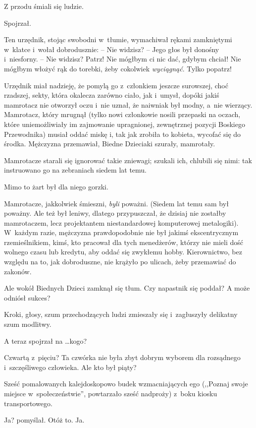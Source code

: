 \documentclass[oneside,polish,11pt,rmheadings]{mwbk}
\begin{document}
Z przodu śmiali się ludzie. 

Spojrzał. 

Ten urzędnik, stojąc swobodni w~tłumie, wymachiwał rękami zamkniętymi w~klatce i~wołał dobrodusznie:  -- Nie widzisz? -- Jego głos był donośny i~niesforny. -- Nie widzisz?  Patrz!  Nie mógłbym ci nic dać, gdybym chciał! Nie mógłbym włożyć rąk do torebki, żeby cokolwiek \textit{wyciągnąć}. Tylko popatrz! 

Urzędnik miał nadzieję, że pomylą go z~członkiem jeszcze surowszej, choć rzadszej, sekty, która okalecza zarówno ciało, jak i~umysł, dopóki jakiś mamrotacz nie otworzył oczu i~nie uznał, że naiwniak był modny, a~nie wierzący. Mamrotacz, który mrugnął (tylko nowi członkowie nosili przepaski na oczach, które uniemożliwiały im zajmowanie upragnionej, zewnętrznej pozycji Boskiego Przewodnika) musiał oddać miskę i, tak jak zrobiła to kobieta, wycofać się do środka. Mężczyzna przemawiał, Biedne Dzieciaki szurały, mamrotały. 

Mamrotacze starali się ignorować takie zniewagi; szukali ich, chlubili się nimi: tak instruowano go na zebraniach siedem lat temu. 

Mimo to żart był dla niego gorzki. 

Mamrotacze, jakkolwiek śmieszni, \textit{byli }poważni. (Siedem lat temu sam był poważny. Ale też był leniwy, dlatego przypuszczał, że dzisiaj nie zostałby mamrotaczem, lecz projektantem niestandardowej komputerowej metalogiki). W~każdym razie, mężczyzna prawdopodobnie nie był jakimś ekscentrycznym rzemieślnikiem, kimś, kto pracował dla tych menedżerów, którzy nie mieli dość wolnego czasu lub kredytu, aby oddać się zwykłemu hobby. Kierownictwo, bez względu na to, jak dobroduszne, nie krążyło po ulicach, żeby przemawiać do zakonów. 

Ale wokół Biednych Dzieci zamknął się tłum. 
Czy napastnik się poddał? A może odniósł sukces? 

Kroki, głosy, szum przechodzących ludzi zmieszały się i~zagłuszyły delikatny szum modlitwy. 

A teraz spojrzał na \ldots  kogo? 

Czwartą z~pięciu? Ta czwórka nie była zbyt dobrym wyborem dla rozsądnego i~szczęśliwego człowieka. Ale kto był piąty? 

Sześć pomalowanych kalejdoskopowo budek wzmacniających ego (,,Poznaj swoje miejsce w~społeczeństwie'', powtarzało sześć nadproży) z~boku kiosku transportowego. 

Ja? pomyślał. Otóż to. Ja. 
\end{document}
